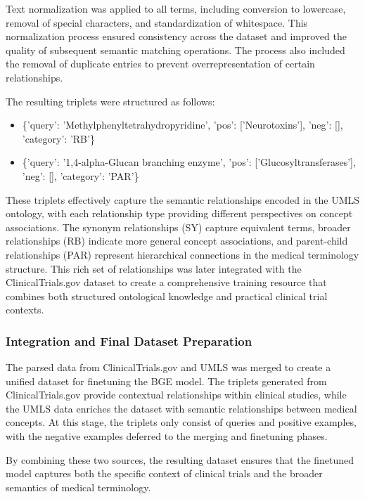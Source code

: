 Text normalization was applied to all terms, including conversion to lowercase, removal of special characters, and standardization of whitespace. This normalization process ensured consistency across the dataset and improved the quality of subsequent semantic matching operations. The process also included the removal of duplicate entries to prevent overrepresentation of certain relationships.

The resulting triplets were structured as follows:

\begin{itemize}
    \item \{'query': 'Methylphenyltetrahydropyridine', 'pos': ['Neurotoxins'], 'neg': [], 'category': 'RB'\}
    \item \{'query': '1,4-alpha-Glucan branching enzyme', 'pos': ['Glucosyltransferases'], 'neg': [], 'category': 'PAR'\}
\end{itemize}

These triplets effectively capture the semantic relationships encoded in the UMLS ontology, with each relationship type providing different perspectives on concept associations. The synonym relationships (SY) capture equivalent terms, broader relationships (RB) indicate more general concept associations, and parent-child relationships (PAR) represent hierarchical connections in the medical terminology structure. This rich set of relationships was later integrated with the ClinicalTrials.gov dataset to create a comprehensive training resource that combines both structured ontological knowledge and practical clinical trial contexts.

\subsubsection{Integration and Final Dataset Preparation}
The parsed data from ClinicalTrials.gov and UMLS was merged to create a unified dataset for finetuning the BGE model. The triplets generated from ClinicalTrials.gov provide contextual relationships within clinical studies, while the UMLS data enriches the dataset with semantic relationships between medical concepts. At this stage, the triplets only consist of queries and positive examples, with the negative examples deferred to the merging and finetuning phases.

By combining these two sources, the resulting dataset ensures that the finetuned model captures both the specific context of clinical trials and the broader semantics of medical terminology.


